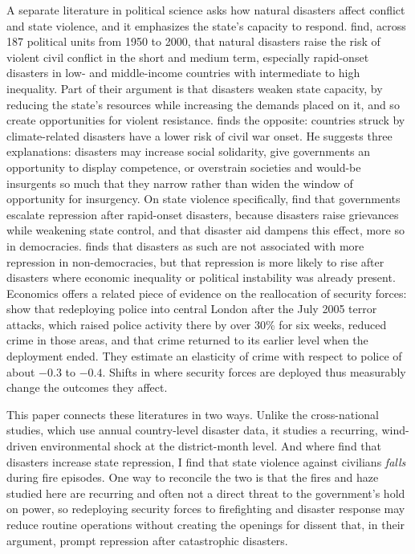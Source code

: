 \documentclass[12pt]{article}
\begin{document}
A separate literature in political science asks how natural disasters affect conflict and state violence, and it emphasizes the state's capacity to respond. \citet{nelrigharts2008} find, across 187 political units from 1950 to 2000, that natural disasters raise the risk of violent civil conflict in the short and medium term, especially rapid-onset disasters in low- and middle-income countries with intermediate to high inequality. Part of their argument is that disasters weaken state capacity, by reducing the state's resources while increasing the demands placed on it, and so create opportunities for violent resistance. \citet{slettebak2012} finds the opposite: countries struck by climate-related disasters have a lower risk of civil war onset. He suggests three explanations: disasters may increase social solidarity, give governments an opportunity to display competence, or overstrain societies and would-be insurgents so much that they narrow rather than widen the window of opportunity for insurgency. On state violence specifically, \citet{woodwright2016} find that governments escalate repression after rapid-onset disasters, because disasters raise grievances while weakening state control, and that disaster aid dampens this effect, more so in democracies. \citet{pfaff2020} finds that disasters as such are not associated with more repression in non-democracies, but that repression is more likely to rise after disasters where economic inequality or political instability was already present. Economics offers a related piece of evidence on the reallocation of security forces: \citet{dracamachinwitt2011} show that redeploying police into central London after the July 2005 terror attacks, which raised police activity there by over 30\% for six weeks, reduced crime in those areas, and that crime returned to its earlier level when the deployment ended. They estimate an elasticity of crime with respect to police of about $-0.3$ to $-0.4$. Shifts in where security forces are deployed thus measurably change the outcomes they affect.

This paper connects these literatures in two ways. Unlike the cross-national studies, which use annual country-level disaster data, it studies a recurring, wind-driven environmental shock at the district-month level. And where \citet{woodwright2016} find that disasters increase state repression, I find that state violence against civilians \emph{falls} during fire episodes. One way to reconcile the two is that the fires and haze studied here are recurring and often not a direct threat to the government's hold on power, so redeploying security forces to firefighting and disaster response may reduce routine operations without creating the openings for dissent that, in their argument, prompt repression after catastrophic disasters.
\end{document}

